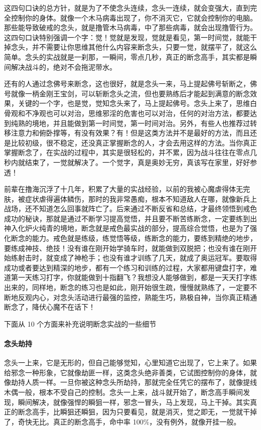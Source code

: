 这四句口诀的总方针，就是为了不使念头连续，念头一连续，就会变强大，直到完全控制你的身体。就像一个木马病毒出现了，你不消灭它，它就会控制你的电脑。那些能导致破戒的念头，就是撸管木马病毒，中了那些病毒，就会出现撸管行为。这四句口诀特别强调一个字：觉！觉就是发现，觉就是看见，第一时间觉，就能干掉念头，并不需要让你思维其他什么内容来断念头，只要一觉，就摆平了，就这么简单。念头的实战就是一刹那，一瞬间，零点几秒，真正的断念高手，其实都是瞬间解决战斗的，绝对不会拖泥带水。

还有的人通过念佛号来断念，这也很好，就是念头一来，马上提起佛号斩断之，佛号就像一柄金刚王宝剑，可以斩断念头之流，但也要熟练后才能起到满意的断念效果，关键的一个字，也是觉，觉知念头来了，马上提起佛号。念头上来了，思维白骨观和不净观也可以对治，思维邪淫的危害也可以对治，任何的对治方法，都要达到纯熟的境地，并且能做到第一时间觉，第一时间对治。另外，有些人也推荐过转移注意力和俯卧撑等，有没有效果？有！但是这类方法并不是最好的方法，而且还是比较初级，很不稳定，还没真正掌握断念的人，才会去用这样的方法。当你真正掌握断念了，在实战的过程中，其实是很轻松的，并不累，因为战斗往往在零点几秒内就结束了，一觉就解决了。一个觉字，真是奥妙无穷，真该写在家里，好好参透！

前辈在撸海沉浮了十几年，积累了大量的实战经验，以前的我被心魔虐得体无完肤，被症状虐得遍体鳞伤，那时的我非常愚痴，根本不知道敌人在哪，就像新兵上战场，还不知道怎么回事就阵亡了。后来通过不断反省和总结，才最终领悟到戒色成功的秘诀，那就是通过不断学习提高觉悟，并且要不断苦练断念，一定要练到出神入化炉火纯青的境地，断念就是戒色最实战的部分，提高综合觉悟，也是为了强化断念的能力。戒色就是练级，练觉悟等级，练断念的能力，要练到精绝的地步，要练成神技、绝技！没有谁在刚开始学骑车时，就能做到双脱把；也没有谁在刚开始练射击时，就变成了神枪手；也没有谁才训练了几天，就成了奥运冠军。要取得成功或者要达到精深的地步，都有一个练习和训练的过程，大家都用键盘打字，难道第一天练习打字，你就能做到十指翻飞？我想没人能够做到，都是一天天打字练出来的，同样地，断念的练习也是如此，刚开始很生疏，慢慢就熟练了，一定要不断地反观内心，对念头活动进行最强的监控，熟能生巧，熟极自神，当你真正精通断念了，降伏心魔不在话下！

下面从 10 个方面来补充说明断念实战的一些细节

\paragraph{念头劫持}

念头一上来，它是无形的，但自己能够觉知，心里知道它出现了，它上来了。如果给邪念一种形象，它就像劫匪一样，这类念头绝非善类，它试图控制你的身体，就像劫持人质一样。一旦你被这种念头所劫持，那就完全任凭它的摆布了，就像提线木偶一般，根本不受自己的控制。念头一上来，战斗就开始了，断念高手瞬间发现，瞬间解决，就像强悍的瞬狙一样，邪念一冒头，马上发现，马上干掉。其实真正的断念高手，比瞬狙还瞬狙，因为只要看见，就是消灭，觉之即无，一觉就干掉了，奇快无比。真正的断念高手，命中率 100\%，没有例外，就像开挂一般。

